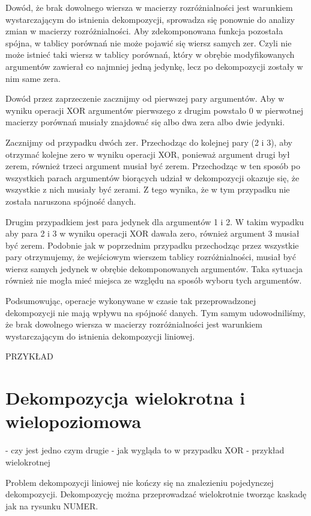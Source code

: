 Dowód,
że brak dowolnego wiersza w macierzy rozróżnialności jest warunkiem wystarczającym do istnienia dekompozycji,
sprowadza się ponownie do analizy zmian w macierzy rozróżnialności.
Aby zdekomponowana funkcja pozostała spójna,
w tablicy porównań nie może pojawić się wiersz samych zer.
Czyli nie może istnieć taki wiersz w tablicy porównań,
który w obrębie modyfikowanych argumentów zawierał co najmniej jedną jedynkę,
lecz po dekompozycji zostały w nim same zera.

Dowód przez zaprzeczenie zacznijmy od pierwszej pary argumentów.
Aby w wyniku operacji XOR argumentów pierwszego z drugim powstało 0 w pierwotnej macierzy porównań musiały znajdować się albo dwa zera albo dwie jedynki.

Zacznijmy od przypadku dwóch zer.
Przechodząc do kolejnej pary (2 i 3),
aby otrzymać kolejne zero w wyniku operacji XOR,
ponieważ argument drugi był zerem,
również trzeci argument musiał być zerem.
Przechodząc w ten sposób po wszystkich parach argumentów biorących udział w dekompozycji okazuje się,
że wszystkie z nich musiały być zerami.
Z tego wynika,
że w tym przypadku nie została naruszona spójność danych.

Drugim przypadkiem jest para jedynek dla argumentów 1 i 2.
W takim wypadku aby para 2 i 3 w wyniku operacji XOR dawała zero,
również argument 3 musiał być zerem.
Podobnie jak w poprzednim przypadku przechodząc przez wszystkie pary otrzymujemy,
że wejściowym wierszem tablicy rozróżnialności,
musiał być wiersz samych jedynek w obrębie dekomponowanych argumentów.
Taka sytuacja również nie mogła mieć miejsca ze względu na sposób wyboru tych argumentów.

Podsumowując,
operacje wykonywane w czasie tak przeprowadzonej dekompozycji nie mają wpływu na spójność danych.
Tym samym udowodniliśmy,
że brak dowolnego wiersza w macierzy rozróżnialności jest warunkiem wystarczającym do istnienia dekompozycji liniowej.

PRZYKŁAD


\section{Dekompozycja wielokrotna i wielopoziomowa}
	- czy jest jedno czym drugie
	- jak wygląda to w przypadku XOR
	- przykład wielokrotnej

Problem dekompozycji liniowej nie kończy się na znalezieniu pojedynczej dekompozycji.
Dekompozycję można przeprowadzać wielokrotnie tworząc kaskadę jak na rysunku NUMER.

